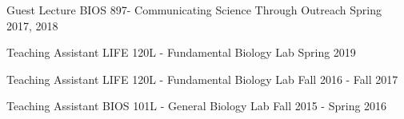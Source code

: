 

\begin{cvoutreaches}

  \cvoutreach
    {Guest Lecture}
    {BIOS 897- Communicating Science Through Outreach}
    {Spring 2017, 2018}
    
  \cvoutreach
    {Teaching Assistant}
    {LIFE 120L - Fundamental Biology Lab}
    {Spring 2019}
  
  \cvoutreach
   {Teaching Assistant}
    {LIFE 120L - Fundamental Biology Lab}
    {Fall 2016 - Fall 2017}
    
  \cvoutreach
    {Teaching Assistant}
    {BIOS 101L - General Biology Lab}
    {Fall 2015 - Spring 2016}
\end{cvoutreaches}
